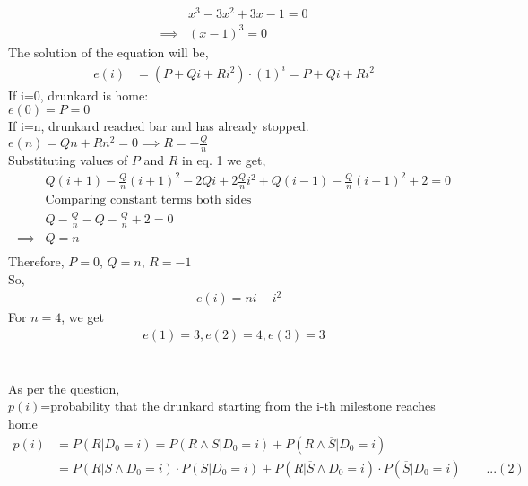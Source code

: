 \documentclass[12pt]{article}
\begin{document}
\begin{solution}
\begin{align*}
       &x^3 - 3  x^2 + 3  x - 1 = 0\\
        \implies &(x-1)^3 = 0
      \end{align*}
       The solution of the equation will be, 
      \begin{align*}
        e(i) &= (P + Qi + Ri^2) \cdot (1)^i 
        = P + Qi +Ri^2
      \end{align*}
        If i=0, drunkard is home:\\
        $e(0)=P=0$ \\
        If i=n, drunkard reached bar and has already stopped.\\
        $e(n)=Qn+Rn^2=0 \implies  R=-\frac{Q}{n}$\\
          
   
      Substituting values of $P$ and $R$ in eq. 1 we get,
      \begin{align*}
          &Q(i+1)-\frac{Q}{n} (i+1)^2 -2Qi+2\frac{Q}{n}i^2 + Q(i-1)-\frac{Q}{n} (i-1)^2 +2=0\\
          &\textrm{Comparing constant terms both sides}\\
          & Q-\frac{Q}{n}-Q-\frac{Q}{n}+2=0\\
          \implies&Q=n\\
      \end{align*}
      Therefore, $P=0$, $Q=n$, $R=-1$\\
      So,
      \begin{align*}
        &e(i)=ni - i^2
      \end{align*}
      For $n=4$, we get
      \begin{align*}
        e(1) = 3,e(2) = 4,e(3) = 3
      \end{align*}\\\\
    As per the question,\\
    $p(i)$=probability that the drunkard starting from the i-th milestone reaches home
    \begin{align*}
      p(i)& = P(R|D_0 = i)
      =P(R\wedge S|
      D_0 = i) + P(R\wedge \overline{S}|D_0 = i)\\
      &=P(R|S\wedge D_0 = i) \cdot P(S|D_0 = i) + P(R|\overline{S}\wedge D_0 = i) \cdot P(\overline{S}|D_0 = i)   \quad\quad...(2)
    \end{align*}
    

\end{solution}
\end{document}
